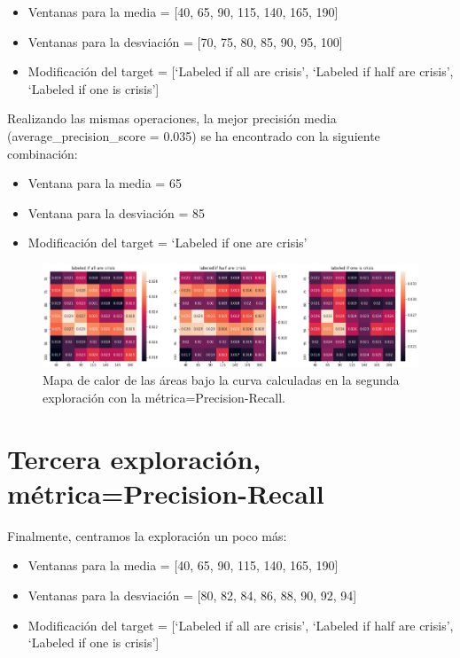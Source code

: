 \documentclass[a4paper,12pt,twoside,oldfontcommands]{memoir}
\begin{document}
\begin{itemize}
    \item Ventanas para la media = [40, 65, 90, 115, 140, 165, 190]
    \item Ventanas para la desviación = [70, 75, 80, 85, 90, 95, 100]
    \item Modificación del target = [`Labeled if all are crisis', `Labeled if half are crisis', `Labeled if one is crisis']
\end{itemize}

Realizando las mismas operaciones, la mejor precisión media (average\_precision\_score = 0.035) se ha encontrado con la siguiente combinación: 
\begin{itemize}
    \item Ventana para la media = 65
    \item Ventana para la desviación = 85
    \item Modificación del target = `Labeled if one are crisis'
\end{itemize}

\begin{figure}
    \centering
    \includegraphics[width=1\textwidth]{images/heatmap5.png}
    \caption{Mapa de calor de las áreas bajo la curva calculadas en la segunda exploración con la métrica=Precision-Recall.}
    \label{fig:heatmap5}
\end{figure}

\section{Tercera exploración, métrica=Precision-Recall}
Finalmente, centramos la exploración un poco más: 
\begin{itemize}
    \item Ventanas para la media = [40, 65, 90, 115, 140, 165, 190]
    \item Ventanas para la desviación = [80, 82, 84, 86, 88, 90, 92, 94]
    \item Modificación del target = [`Labeled if all are crisis', `Labeled if half are crisis', `Labeled if one is crisis']
\end{itemize}
\end{document}
